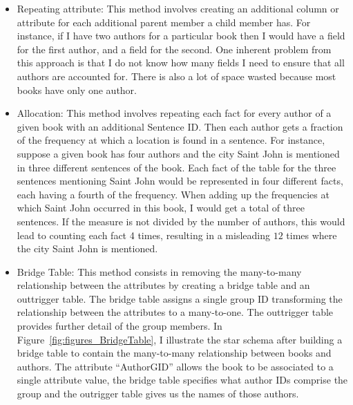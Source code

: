 \begin{itemize}

\item Repeating attribute: This method involves creating an additional column or attribute for each additional parent member a child member has. For instance,
if I have two authors for a particular book then I would have a field for the first author, and a field for the second. One inherent problem from this approach
is that I do not know how many fields I need to ensure that all authors are accounted for. There is also a lot of space wasted because most books have only one
author.

\item Allocation: This method involves repeating each fact for every author of a given book with an additional Sentence ID. Then each author gets a fraction of
the frequency at which a location is found in a sentence. For instance, suppose a given book has four authors and the city Saint John is mentioned in three
different sentences of the book. Each fact of the table for the three sentences mentioning Saint John would be represented in four different facts, each having
a fourth of the frequency. When adding up the frequencies at which Saint John occurred in this book, I would get a total of three sentences. If the measure is
not divided by the number of authors, this would lead to counting each fact 4 times, resulting in a misleading $12$ times where the city Saint John is
mentioned.

\item Bridge Table: This method consists in removing the many-to-many relationship between the attributes by creating a bridge table and an outtrigger table.
The bridge table assigns a single group ID transforming the relationship between the attributes to a many-to-one. The outtrigger table provides further detail
of the group members. In Figure~\ref{fig:figures_BridgeTable}, I illustrate the star schema after building a bridge table to contain the many-to-many
relationship between books and authors. The attribute ``AuthorGID'' allows the book to be associated to a single attribute value, the bridge table specifies
what author IDs comprise the group and the outrigger table gives us the names of those authors.


\end{itemize}
